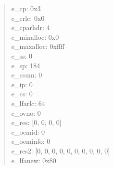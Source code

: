 \documentclass[12pt,a4paper,dvipdfmx]{jsarticle}
\begin{document}
\begin{quote}
e\_cp:		0x3 \\
e\_crlc:		0x0 \\
e\_cparhdr:	4 \\
e\_minalloc:	0x0 \\
e\_maxalloc:	0xffff \\
e\_ss:		0 \\
e\_sp:		184 \\
e\_csum:		0 \\
e\_ip:		0 \\
e\_cs:		0 \\
e\_lfarlc:	64 \\
e\_ovno:		0 \\
e\_res:		[0, 0, 0, 0] \\
e\_oemid:	0 \\
e\_oeminfo:	0 \\
e\_res2:		[0, 0, 0, 0, 0, 0, 0, 0, 0, 0] \\
e\_lfanew:	0x80 \\
\end{quote}
\end{document}
